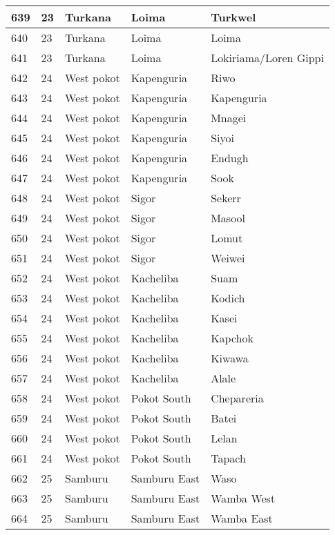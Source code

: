 \begin{table}[!ht]
\begin{tabular}{|l|l|l|l|l|}
        639 & 23 & Turkana & Loima & Turkwel \\ \hline
        640 & 23 & Turkana & Loima & Loima \\ \hline
        641 & 23 & Turkana & Loima & Lokiriama/Loren Gippi \\ \hline
        642 & 24 & West pokot & Kapenguria & Riwo \\ \hline
        643 & 24 & West pokot & Kapenguria & Kapenguria \\ \hline
        644 & 24 & West pokot & Kapenguria & Mnagei \\ \hline
        645 & 24 & West pokot & Kapenguria & Siyoi \\ \hline
        646 & 24 & West pokot & Kapenguria & Endugh \\ \hline
        647 & 24 & West pokot & Kapenguria & Sook \\ \hline
        648 & 24 & West pokot & Sigor & Sekerr \\ \hline
        649 & 24 & West pokot & Sigor & Masool \\ \hline
        650 & 24 & West pokot & Sigor & Lomut \\ \hline
        651 & 24 & West pokot & Sigor & Weiwei \\ \hline
        652 & 24 & West pokot & Kacheliba & Suam \\ \hline
        653 & 24 & West pokot & Kacheliba & Kodich \\ \hline
        654 & 24 & West pokot & Kacheliba & Kasei \\ \hline
        655 & 24 & West pokot & Kacheliba & Kapchok \\ \hline
        656 & 24 & West pokot & Kacheliba & Kiwawa \\ \hline
        657 & 24 & West pokot & Kacheliba & Alale \\ \hline
        658 & 24 & West pokot & Pokot South & Chepareria \\ \hline
        659 & 24 & West pokot & Pokot South & Batei \\ \hline
        660 & 24 & West pokot & Pokot South & Lelan \\ \hline
        661 & 24 & West pokot & Pokot South & Tapach \\ \hline
        662 & 25 & Samburu & Samburu East & Waso \\ \hline
        663 & 25 & Samburu & Samburu East & Wamba West \\ \hline
        664 & 25 & Samburu & Samburu East & Wamba East \\ \hline

\end{tabular}
\end{table}
